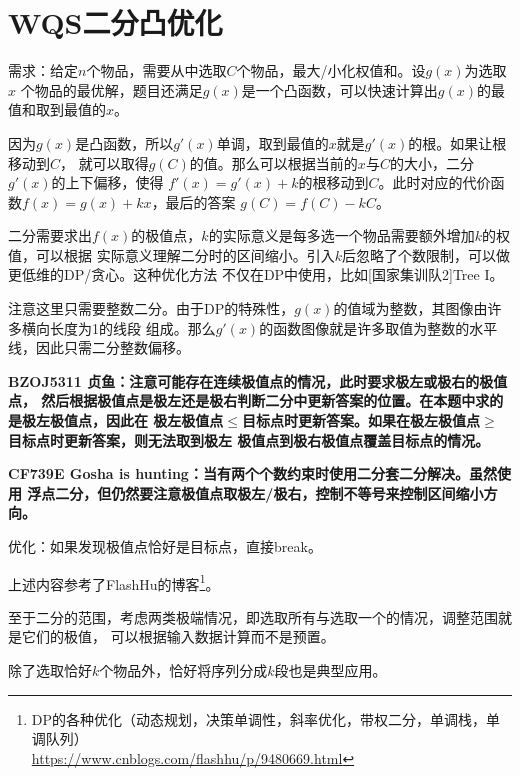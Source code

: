 \section{WQS二分凸优化}
需求：给定$n$个物品，需要从中选取$C$个物品，最大/小化权值和。设$g(x)$为选取$x$
个物品的最优解，题目还满足$g(x)$是一个凸函数，可以快速计算出$g(x)$的最值和取到最值的$x$。

因为$g(x)$是凸函数，所以$g'(x)$单调，取到最值的$x$就是$g'(x)$的根。如果让根移动到$C$，
就可以取得$g(C)$的值。那么可以根据当前的$x$与$C$的大小，二分$g'(x)$的上下偏移，使得
$f'(x)=g'(x)+k$的根移动到$C$。此时对应的代价函数$f(x)=g(x)+kx$，最后的答案
$g(C)=f(C)-kC$。

二分需要求出$f(x)$的极值点，$k$的实际意义是每多选一个物品需要额外增加$k$的权值，可以根据
实际意义理解二分时的区间缩小。引入$k$后忽略了个数限制，可以做更低维的DP/贪心。这种优化方法
不仅在DP中使用，比如[国家集训队2]Tree I。

注意这里只需要整数二分。由于DP的特殊性，$g(x)$的值域为整数，其图像由许多横向长度为1的线段
组成。那么$g'(x)$的函数图像就是许多取值为整数的水平线，因此只需二分整数偏移。

{\bfseries BZOJ5311 贞鱼：注意可能存在连续极值点的情况，此时要求极左或极右的极值点，
然后根据极值点是极左还是极右判断二分中更新答案的位置。在本题中求的是极左极值点，因此在
极左极值点$\leq$目标点时更新答案。如果在极左极值点$\geq$目标点时更新答案，则无法取到极左
极值点到极右极值点覆盖目标点的情况。}

{\bfseries CF739E Gosha is hunting：当有两个个数约束时使用二分套二分解决。虽然使用
浮点二分，但仍然要注意极值点取极左/极右，控制不等号来控制区间缩小方向。}

优化：如果发现极值点恰好是目标点，直接break。

上述内容参考了FlashHu的博客\footnote{
    DP的各种优化（动态规划，决策单调性，斜率优化，带权二分，单调栈，单调队列）\\
    \url{https://www.cnblogs.com/flashhu/p/9480669.html}
}。

至于二分的范围，考虑两类极端情况，即选取所有与选取一个的情况，调整范围就是它们的极值，
可以根据输入数据计算而不是预置。

除了选取恰好$k$个物品外，恰好将序列分成$k$段也是典型应用。
